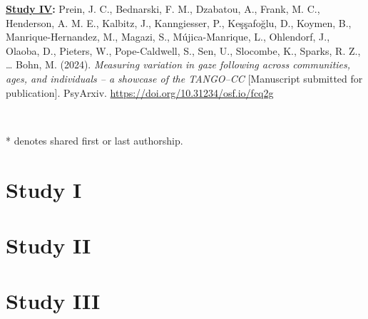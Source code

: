 \documentclass[
]{scrbook}
\begin{document}
\textbf{\hyperref[studyIV]{Study IV}:} Prein, J. C., Bednarski, F. M., Dzabatou, A., Frank, M. C., Henderson, A. M. E., Kalbitz, J., Kanngiesser, P., Keşşafoğlu, D., Koymen, B., Manrique-Hernandez, M., Magazi, S., Mújica-Manrique, L., Ohlendorf, J., Olaoba, D., Pieters, W., Pope-Caldwell, S., Sen, U., Slocombe, K., Sparks, R. Z., \ldots{} Bohn, M. (2024). \emph{Measuring variation in gaze following across communities, ages, and individuals -- a showcase of the TANGO--CC} {[}Manuscript submitted for publication{]}. PsyArxiv. \mbox{\url{https://doi.org/10.31234/osf.io/fcq2g}}

~

* denotes shared first or last authorship.

\newpage

\section*{Study I}\label{studyI}

\begin{minipage}{\textwidth}

\end{minipage}



\newpage

\section*{Study II}\label{studyII}

\begin{minipage}{\textwidth}

\end{minipage}



\newpage

\section*{Study III}\label{studyIII}

\begin{minipage}{\textwidth}

\end{minipage}
\end{document}
